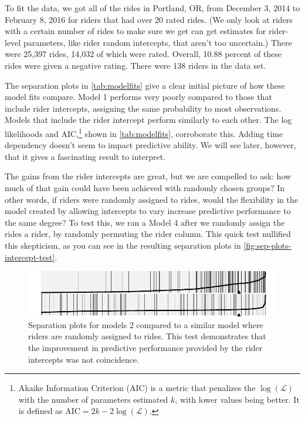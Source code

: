\documentclass[]{article}
\let\rmarkdownfootnote\footnote%
\def\footnote{\protect\rmarkdownfootnote}
\begin{document}

To fit the data, we got all of the rides in Portland, OR, from December
3, 2014 to February 8, 2016 for riders that had over 20 rated rides. (We
only look at riders with a certain number of rides to make sure we get
can get estimates for rider-level parameters, like rider random
intercepts, that aren't too uncertain.) There were 25,397 rides, 14,032
of which were rated. Overall, 10.88 percent of these rides were given a
negative rating. There were 138 riders in the data set.

The separation plots in \autoref{tab:modelfits} give a clear initial
picture of how these model fits compare. Model 1 performs very poorly
compared to those that include rider intercepts, assigning the same
probability to most observations. Models that include the rider
intercept perform similarly to each other. The log likelihoods and
AIC,\footnote{Akaike Information Criterion (AIC) is a metric that
  penalizes the \(\log (\mathcal{L})\) with the number of parameters
  estimated \(k\), with lower values being better. It is defined as
  \(\text{AIC} = 2k - 2 \log(\mathcal{L})\).} shown in
\autoref{tab:modelfits}, corroborate this. Adding time dependency
doesn't seem to impact predictive ability. We will see later, however,
that it gives a fascinating result to interpret.

The gains from the rider intercepts are great, but we are compelled to
ask: how much of that gain could have been achieved with randomly chosen
groups? In other words, if riders were randomly assigned to rides, would
the flexibility in the model created by allowing intercepts to vary
increase predictive performance to the same degree? To test this, we ran
a Model 4 after we randomly assign the rides a rider, by randomly
permuting the rider column. This quick test nullified this skepticism,
as you can see in the resulting separation plots in
\autoref{fig:sep-plots-intercept-test}.

\begin{figure}[tbh]
\centering
\includegraphics[angle = 0,scale = 1]{figure/intercept_test_plot.pdf}
\caption[Separation plots for models 2 compared to a similar model where
riders are randomly assigned to rides]{\normalsize{Separation plots for models 2 compared to a similar model where
riders are randomly assigned to rides. This test demonstrates that the 
improvement in predictive performance provided by the rider intercepts
was not coincidence.}}
\label{fig:sep-plots-intercept-test}
\end{figure}
\end{document}

